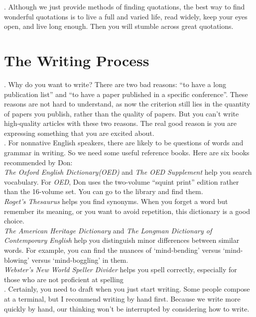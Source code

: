 \documentclass[12pt,a4paper]{article}  %
\theoremstyle{definition}
\numberwithin{equation}{section}
\begin{document}
. Although we just provide methods of finding quotations, the best way to find wonderful quotations is to live a full and varied life, read widely, keep your eyes open, and live long enough. Then you will stumble across great quotations.\\



\section{The Writing Process}
. Why do you want to write? There are two bad reasons: ``to have a long publication list'' and ``to have a paper published in a specific conference''. These reasons are not hard to understand, as now the criterion still lies in the quantity of papers you publish, rather than the quality of papers. But you can't write high-quality articles with these two reasons. The real good reason is you are expressing something that you are excited about.\\

. For nonnative English speakers, there are likely to be questions of words and grammar in writing. So we need some useful reference books. Here are six books recommended by Don:\\
\textit{The Oxford English Dictionary(OED)} and \textit{The OED Supplement} help you search vocabulary. For \textit{OED}, Don uses the two-volume ``squint print'' edition rather than the 16-volume set. You can go to the library and find them.\\
\textit{Roget's Thesaurus }helps you find synonyms. When you forget a word but remember its meaning, or you want to avoid repetition, this dictionary is a good choice.\\
\textit{The American Heritage Dictionary} and \textit{The Longman Dictionary of Contemporary English} help you distinguish minor differences between similar words. For example, you can find the nuances of `mind-bending' versus `mind-blowing' versus `mind-boggling' in them.\\
\textit{Webster's New World Speller Divider} helps you spell correctly, especially for those who are not proficient at spelling\\

. Certainly, you need to draft when you just start writing. Some people compose at a terminal, but I recommend writing by hand first. Because we write more quickly by hand, our thinking won't be interrupted by considering how to write.\\
\end{document}
